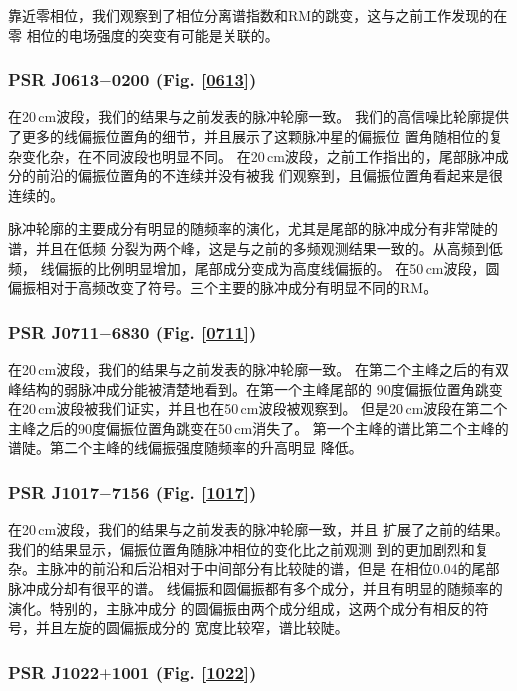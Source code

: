 靠近零相位，我们观察到了相位分离谱指数和RM的跳变，这与之前工作发现的在零
相位的电场强度的突变有可能是关联的\supercite{Oslowski14}。

\subsubsection{PSR J0613$-$0200 (Fig. \ref{0613})}

在20\,cm波段，我们的结果与之前发表的脉冲轮廓一致\supercite{Ord04,Yan11a}。
我们的高信噪比轮廓提供了更多的线偏振位置角的细节，并且展示了这颗脉冲星的偏振位
置角随相位的复杂变化杂，在不同波段也明显不同。
%
在20\,cm波段，之前工作指出的，尾部脉冲成分的前沿的偏振位置角的不连续并没有被我
们观察到\supercite{Yan11a}，且偏振位置角看起来是很连续的。

脉冲轮廓的主要成分有明显的随频率的演化，尤其是尾部的脉冲成分有非常陡的谱，并且在低频
分裂为两个峰，这是与之前的多频观测结果一致的\supercite{Stairs99}。从高频到低频，
线偏振的比例明显增加，尾部成分变成为高度线偏振的。
%
在50\,cm波段，圆偏振相对于高频改变了符号。三个主要的脉冲成分有明显不同的RM。


\subsubsection{PSR J0711$-$6830 (Fig. \ref{0711})}

在20\,cm波段，我们的结果与之前发表的脉冲轮廓一致\supercite{Ord04,Yan11a}。
在第二个主峰之后的有双峰结构的弱脉冲成分能被清楚地看到。在第一个主峰尾部的
90度偏振位置角跳变在20\,cm波段被我们证实，并且也在50\,cm波段被观察到。
但是20\,cm波段在第二个主峰之后的90度偏振位置角跳变在50\,cm消失了。
%
第一个主峰的谱比第二个主峰的谱陡。第二个主峰的线偏振强度随频率的升高明显
降低。

\subsubsection{PSR J1017$-$7156 (Fig. \ref{1017})}

在20\,cm波段，我们的结果与之前发表的脉冲轮廓一致\supercite{Keith12}，并且
扩展了之前的结果。我们的结果显示，偏振位置角随脉冲相位的变化比之前观测
到的更加剧烈和复杂。主脉冲的前沿和后沿相对于中间部分有比较陡的谱，但是
在相位0.04的尾部脉冲成分却有很平的谱。
%
线偏振和圆偏振都有多个成分，并且有明显的随频率的演化。特别的，主脉冲成分
的圆偏振由两个成分组成，这两个成分有相反的符号，并且左旋的圆偏振成分的
宽度比较窄，谱比较陡。

\subsubsection{PSR J1022$+$1001 (Fig. \ref{1022})}

